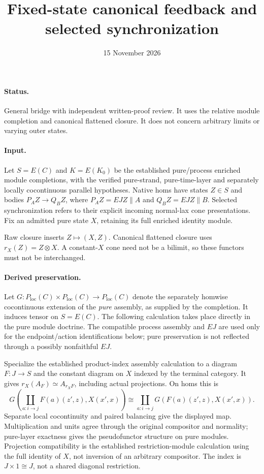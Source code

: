 \documentclass{article}
\title{Fixed-state canonical feedback and selected synchronization}
\date{15 November 2026}
\begin{document}
\maketitle
\paragraph{Status.} General bridge with independent written-proof review. It uses the relative module completion and canonical flattened closure. It does not concern arbitrary limits or varying outer states.

\paragraph{Input.} Let $S=E(C)$ and $K=E(K_0)$ be the established pure/process enriched module completions, with the verified pure-strand, pure-time-layer and separately locally cocontinuous parallel hypotheses. Native homs have states $Z\in S$ and bodies $P_AZ\to Q_BZ$, where $P_AZ=EJZ\parallel A$ and $Q_BZ=EJZ\parallel B$. Selected synchronization refers to their explicit incoming normal-lax cone presentations. Fix an admitted pure state $X$, retaining its full enriched identity module.

Raw closure inserts $Z\mapsto(X,Z)$. Canonical flattened closure uses $r_X(Z)=Z\otimes X$. A constant-$X$ cone need not be a bilimit, so these functors must not be interchanged.

\paragraph{Derived preservation.} Let $G:P_{\mathrm{loc}}(C)\times P_{\mathrm{loc}}(C)\to P_{\mathrm{loc}}(C)$ denote the separately homwise cocontinuous extension of the \emph{pure} assembly, as supplied by the completion. It induces tensor on $S=E(C)$. The following calculation takes place directly in the pure module doctrine. The compatible process assembly and $EJ$ are used only for the endpoint/action identifications below; pure preservation is not reflected through a possibly nonfaithful $EJ$.

Specialize the established product-index assembly calculation to a diagram $F:J\to S$ and the constant diagram on $X$ indexed by the terminal category. It gives $r_X(A_F)\simeq A_{r_XF}$, including actual projections. On homs this is
\[
 G(\coprod_{a:i\to j}F(a)(z',z),X(x',x))
 \cong\coprod_{a:i\to j}G(F(a)(z',z),X(x',x)).
\]
Separate local cocontinuity and paired balancing give the displayed map. Multiplication and units agree through the original compositor and normality; pure-layer exactness gives the pseudofunctor structure on pure modules. Projection compatibility is the established restriction-module calculation using the full identity of $X$, not inversion of an arbitrary compositor. The index is $J\times1\cong J$, not a shared diagonal restriction.
\end{document}
